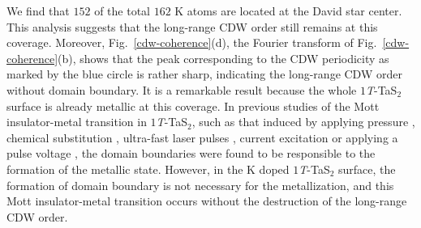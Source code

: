 \documentclass[aps,prl,reprint,groupedaddress,showpacs,amsfonts,amsmath,amssymb,superscriptaddress]{revtex4-1}
\begin{document}
We find that $152$ of the total $162$ K atoms are located at the David star center. This analysis suggests that the long-range CDW order still remains at this coverage. Moreover, Fig.~\ref{cdw-coherence}(d), the Fourier transform of Fig.~\ref{cdw-coherence}(b), shows that the peak corresponding to the CDW periodicity as marked by the blue circle is rather sharp, indicating the long-range CDW order without domain boundary. It is a remarkable result because the whole $1$\emph{T}-TaS$_{2}$ surface is already metallic at this coverage. In previous studies of the Mott insulator-metal transition in $1$\emph{T}-TaS$_{2}$, such as that induced by applying pressure \cite{nmat2318}, chemical substitution \cite{PhysRevX.7.041054}, ultra-fast laser pulses \cite{Stojchevska177}, current excitation \cite{ncomms11442,Yoshidae1500606} or applying a pulse voltage \cite{ncomms10956}, the domain boundaries were found to be responsible to the formation of the metallic state. However, in the K doped $1$\emph{T}-TaS$_{2}$ surface, the formation of domain boundary is not necessary for the metallization, and this Mott insulator-metal transition occurs without the destruction of the long-range CDW order.
\end{document}
